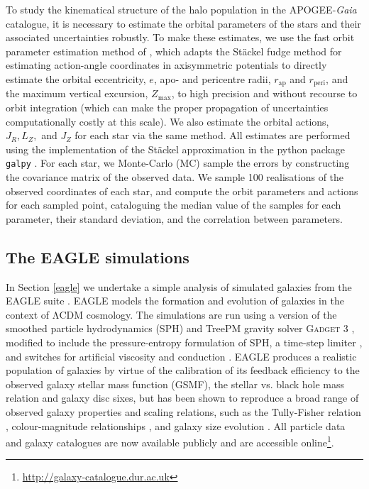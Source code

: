 To study the kinematical structure of the halo population
in the APOGEE-\emph{Gaia} catalogue, it is necessary to
estimate the orbital parameters of the stars and their associated
uncertainties robustly. To make these estimates, we use the fast orbit
parameter estimation method of \citet{2018arXiv180202592M}, which
adapts the St\"ackel fudge method for estimating action-angle
coordinates in axisymmetric potentials \citep[presented in][]{2012MNRAS.426.1324B}
to directly estimate the orbital eccentricity, $e$, apo-
and pericentre radii, $r_\mathrm{ap}$ and $r_\mathrm{peri}$, and the
maximum vertical excursion, $Z_\mathrm{max}$, to high precision and
without recourse to orbit integration (which can make the proper
propagation of uncertainties computationally costly at this scale).
We also estimate the orbital actions, $J_{R}, L_{Z},$ and $J_{Z}$
for each star via the same method. All estimates are performed
using the implementation of the St\"ackel approximation in the
python package \texttt{galpy} \citep{2015ApJS..216...29B}. For each
star, we Monte-Carlo (MC) sample the errors by constructing the
covariance matrix of the observed data. We sample 100 realisations
of the observed coordinates of each star, and compute the orbit
parameters and actions for each sampled point, cataloguing the
median value of the samples for each parameter, their standard
deviation, and the correlation between parameters.

\subsection{The EAGLE simulations}

In Section \ref{eagle} we undertake a simple analysis of
simulated galaxies from the EAGLE suite
\citep{2015MNRAS.446..521S,2015MNRAS.450.1937C}. EAGLE models the
formation and evolution of galaxies in the context of $\mathrm{\Lambda
CDM}$ cosmology. The simulations are run using a version of the
smoothed particle hydrodynamics (SPH) and TreePM gravity solver
\textsc{Gadget 3} \citep[described most recently by
][]{2005MNRAS.364.1105S}, modified to include the
\citet{2013MNRAS.428.2840H} pressure-entropy formulation of SPH, a
time-step limiter \citep{2012MNRAS.419..465D}, and switches for
artificial viscosity and conduction \citep[as proposed
by][]{2010MNRAS.408..669C,2010MNRAS.401.1475P}. EAGLE produces a
realistic population of galaxies by virtue of the calibration of its feedback efficiency to
the observed galaxy stellar mass function (GSMF), the stellar vs. black hole mass relation and galaxy disc sixes, but has been shown to reproduce a broad range of observed galaxy properties and scaling
relations, such as the Tully-Fisher relation \citep{2017MNRAS.464.4736F},
colour-magnitude relationships
\citep{2015MNRAS.452.2879T,2016MNRAS.460.3925T,2017MNRAS.470..771T}, and
galaxy size evolution \citep{2017MNRAS.465..722F}. All particle data and galaxy catalogues are now available publicly \citep[see][]{2016A&C....15...72M} and are accessible online\footnote{\url{http://galaxy-catalogue.dur.ac.uk}}.

